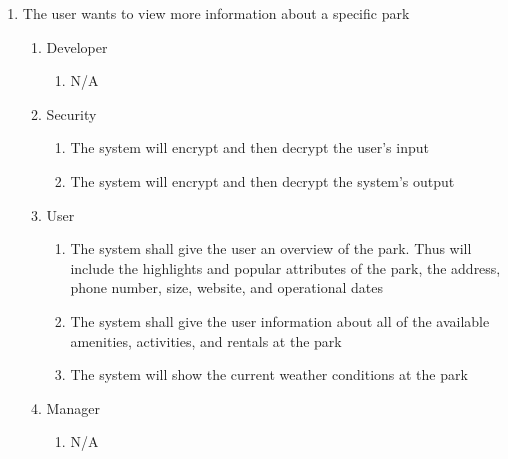 \documentclass[titlepage]{article}
\begin{document}
\begin{enumerate}[{BE}1.]
    \item The user wants to view more information about a specific park
    \begin{enumerate}[{VP\theenumi}.1]
        \item Developer
            \begin{enumerate}
                \item N/A
            \end{enumerate}
        \item Security
            \begin{enumerate}
                \item The system will encrypt and then decrypt the user's input
                \item The system will encrypt and then decrypt the system's output
            \end{enumerate}
        \item User
            \begin{enumerate}
                \item The system shall give the user an overview of the park. Thus will include the
                highlights and popular attributes of the park, the address, phone number, size,
                website, and operational dates
                \item The system shall give the user information about all of the available
                amenities, activities, and rentals at the park
                \item The system will show the current weather conditions at the park
            \end{enumerate}
        \item Manager
            \begin{enumerate}
                \item N/A
            \end{enumerate}
    \end{enumerate}


\end{enumerate}
\end{document}
